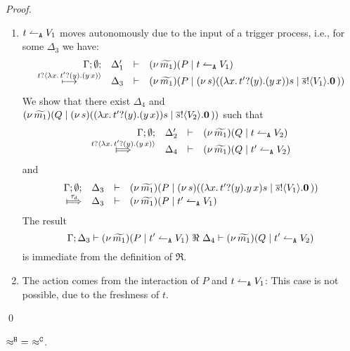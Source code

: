 \begin{proof}
\begin{enumerate}[1.]
\begin{enumerate}
					\item	$t \leftharpoonup_\mathtt{A} V_1$ moves autonomously due to the input of a trigger process, i.e., for some $\Delta_3$ we have:
						\[
							\begin{array}{rcll} \Gamma; \emptyset; &\Delta_1'& \vdash& (\nu\, \widetilde{m_1})(P \;|\; t \leftharpoonup_\mathtt{A} V_1)\\ \stackrel{t ? \langle  \lambda x.\,t' ? (y) .{(y\, {x})}  \rangle}{\longmapsto} &\Delta_3& \vdash &  (\nu\, \widetilde{m_1})(P \;|\; (\nu\, s)(  (\lambda x.\,t' ? (y) .{(y\, {x})}){s}  \;|\; \overline{s} ! \langle V_1 \rangle . \mathbf{0} \, {)}) \end{array}
						\]
						We show that there
                                                exist $\Delta_4$ and  $(\nu\, \widetilde{m_1})(Q \;|\; (\nu\, s)(  (\lambda x.\,t' ? (y) .{(y\, {x})}){s}  \;|\; \overline{s} ! \langle V_2 \rangle . \mathbf{0} \, {)})$ such that
						\[
							\mhorel{\Gamma}{\Delta_2'}{\newsp{\widetilde{m_1}}{Q \Par \ntrigger{t}{V_2}}}
							{\Hby{\bactinp{t}{ \abs{x}{\binp{t'}{y}{(\appl{y}{x})}  }}}}
							{\Delta_4}{}{\newsp{\widetilde{m_1}}{Q \Par \ntrigger{t'}{V_2} }}
						\]
						and
						\[
							\mhorel{\Gamma}{\Delta_3}{\newsp{\widetilde{m_1}}{P \Par \newsp{s}{ \appl{(\abs{x}{\binp{t'}{y}{\appl{y}{x}})}{s}  \Par \bout{\dual{s}}{V_1} \inact }}}}
							{\Hby{\dtau}}
							{\Delta_3}{}{\newsp{\widetilde{m_1}}{P \Par \ntrigger{t'}{V_1}}}
						\]
						The result
						\[
							\Gamma; \Delta_3 \vdash (\nu\, \widetilde{m_1})(P \;|\; t' \leftharpoonup_\mathtt{A} V_1) \ \Re\  \Delta_4 \vdash (\nu\, \widetilde{m_1})(Q \;|\; t' \leftharpoonup_\mathtt{A} V_2)
						\]
						is immediate from the definition of $\Re$.

				\item The action comes from the interaction of $P$ and $t \leftharpoonup_\mathtt{A} V_1$: This case is not possible, due to the freshness of $t$.
				\end{enumerate}
	\end{enumerate}
	\qed
\end{proof}



\begin{lemma}
	\label{app:lem:wb_eq_wbf}
	$\approx^\mathtt{H}\ =\ \approx^\mathtt{C}$.
\end{lemma}

